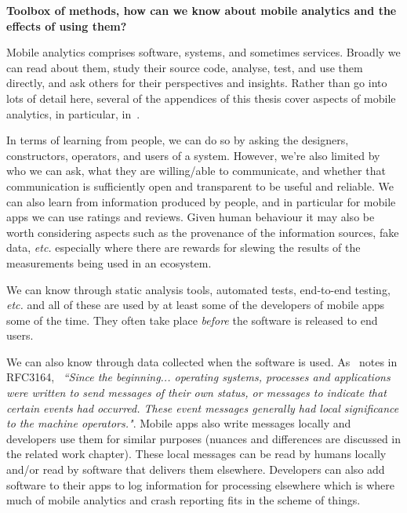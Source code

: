 \textbf{Toolbox of methods, how can we know about mobile analytics and the effects of using them?} 

Mobile analytics comprises software, systems, and sometimes services. Broadly we can read about them, study their source code, analyse, test, and use them directly, and ask others for their perspectives and insights. Rather than go into lots of detail here, several of the appendices of this thesis cover aspects of mobile analytics, in particular, in~\href{chapter-on-mobile-analytics}{\emph{}}. 

In terms of learning from people, we can do so by asking the designers, constructors, operators, and users of a system. However, we're also limited by who we can ask, what they are willing/able to communicate, and whether that communication is sufficiently open and transparent to be useful and reliable. We can also learn from information produced by people, and in particular for mobile apps we can use ratings and reviews. Given human behaviour it may also be worth considering aspects such as the provenance of the information sources, fake data, \emph{etc.} especially where there are rewards for slewing the results of the measurements being used in an ecosystem. 

We can know through static analysis tools, automated tests, end-to-end testing, \emph{etc.} and all of these are used by at least some of the developers of mobile apps some of the time. They often take place \textit{before} the software is released to end users.

We can also know through data collected when the software is used. As~\cite{RFC3164} notes in RFC3164, ~\emph{``Since the beginning... operating systems, processes and applications were written to send messages of their own status, or messages to indicate that certain events had occurred. These event messages generally had local significance to the machine operators."}. Mobile apps also write messages locally and developers use them for similar purposes (nuances and differences are discussed in the related work chapter). These local messages can be read by humans locally and/or read by software that delivers them elsewhere. Developers can also add software to their apps to log information for processing elsewhere which is where much of mobile analytics and crash reporting fits in the scheme of things.

